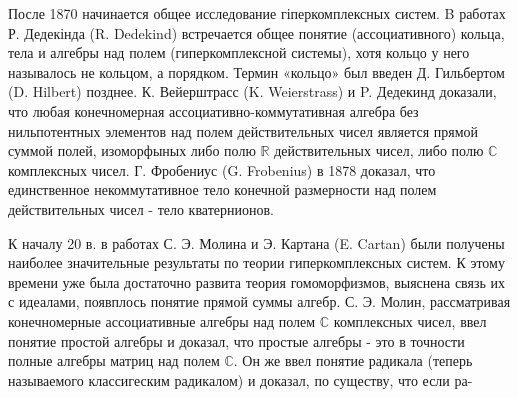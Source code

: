 \documentclass[10pt]{article}
\begin{document}
После 1870 начинается общее исследование гіперкомплексных систем. B работах Р. Дедекінда (R. Dedekind) встречается общее понятие (ассоциативного) кольца, тела и алгебры над полем (гиперкомплексной системы), хотя кольцо у него называлось не кольцом, а порядком. Термин «кольцо» был введен Д. Гильбертом (D. Hilbert) позднее. К. Вейерштрасс (K. Weierstrass) и P. Дедекинд доказали, что любая конечномерная ассоциативно-коммутативная алгебра без нильпотентных элементов над полем действительных чисел является прямой суммой полей, изоморфыных либо полю $\mathbb{R}$ действительных чисел, либо полю $\mathbb{C}$ комплексных чисел. Г. Фробениус (G. Frobenius) в 1878 доказал, что единственное некоммутативное тело конечной размерности над полем действительных чисел - тело кватернионов.



К началу 20 в. в работах С. Э. Молина и Э. Картана (E. Cartan) были получены наиболее значительные результаты по теории гиперкомплексных систем. К этому времени уже была достаточно развита теория гомоморфизмов, выяснена связь их с идеалами, появплось понятие прямой суммы алгебр. С. Э. Молин, рассматривая конечномерные ассоциативные алгебры над полем $\mathbb{C}$ комплексных чисел, ввел понятие простой алгебры и доказал, что простые алгебры - это в точности полные алгебры матриц над полем $\mathbb{C}$. Он же ввел понятие радикала (теперь называемого классигеским радикалом) и доказал, по существу, что если ра-
\end{document}
